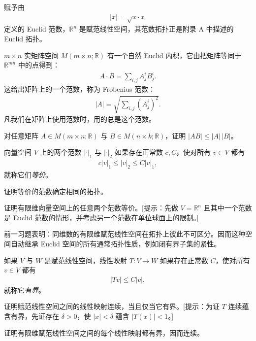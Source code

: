 \documentclass[../../main.tex]{subfiles}
\begin{document}
\begin{example}[Euclid 空间]\label{example:appB-euclidean-norm}
赋予由
\begin{align}\label{align:appB-euclidean-norm}
|x|=\sqrt{x\cdot x}
\end{align}
定义的 Euclid 范数，$\mathbb R^n$ 是赋范线性空间，其范数拓扑正是附录 A 中描述的 Euclid 拓扑。
\end{example}

\begin{example}\label{example:appB-frobenius}
$m\times n$ 实矩阵空间 $M(m\times n;\mathbb R)$ 有一个自然 Euclid 内积，它由把矩阵等同于 $\mathbb R^{mn}$ 中的点得到：
\begin{align*}
A\cdot B=\sum_{i,j}A^i_j B^i_j.
\end{align*}
这给出矩阵上的一个范数，称为 Frobenius 范数：
\begin{align}\label{align:appB-frobenius}
|A|=\sqrt{\sum_{i,j}(A^i_j)^2}.
\end{align}
凡我们在矩阵上使用范数时，用的总是这个范数。
\end{example}

\begin{exercise}\label{exercise:appB-B-48}
对任意矩阵 $A\in M(m\times n;\mathbb R)$ 与 $B\in M(n\times k;\mathbb R)$，证明 $|AB|\leqslant|A|\,|B|$。
\end{exercise}

向量空间 $V$ 上的两个范数 $|\cdot|_1$ 与 $|\cdot|_2$ 如果存在正常数 $c,C$，使对所有 $v\in V$ 都有
\begin{align*}
c|v|_1\leqslant|v|_2\leqslant C|v|_1,
\end{align*}
就称它们\emph{等价}。

\begin{exercise}\label{exercise:appB-B-49}
证明等价的范数确定相同的拓扑。
\end{exercise}

\begin{exercise}\label{exercise:appB-B-50}
证明有限维向量空间上的任意两个范数等价。[提示：先做 $V=\mathbb R^n$ 且其中一个范数是 Euclid 范数的情形，并考虑另一个范数在单位球面上的限制。]
\end{exercise}

前一习题表明：同维数的有限维赋范线性空间在拓扑上彼此不可区分。因而这种空间自动继承 Euclid 空间的所有通常拓扑性质，例如闭有界子集的紧性。

如果 $V$ 与 $W$ 是赋范线性空间，线性映射 $T:V\to W$ 如果存在正常数 $C$，使对所有 $v\in V$ 都有
\begin{align*}
|Tv|\leqslant C|v|,
\end{align*}
就称它\emph{有界}。

\begin{exercise}\label{exercise:appB-B-51}
证明赋范线性空间之间的线性映射连续，当且仅当它有界。[提示：为证 $T$ 连续蕴含有界，先证存在 $\delta>0$，使 $|x|<\delta$ 蕴含 $|T(x)|<1$。]
\end{exercise}

\begin{exercise}\label{exercise:appB-B-52}
证明有限维赋范线性空间之间的每个线性映射都有界，因而连续。
\end{exercise}
\end{document}
